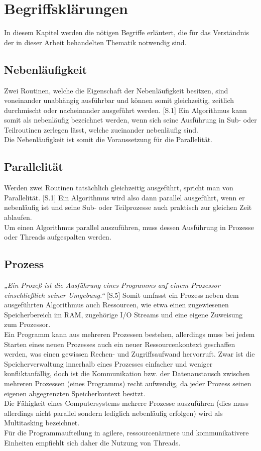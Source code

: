 \chapter{Begriffsklärungen}
In diesem Kapitel werden die nötigen Begriffe erläutert, die für das Verständnis der in dieser Arbeit behandelten Thematik notwendig sind.

\section{Nebenläufigkeit}
Zwei Routinen, welche die Eigenschaft der Nebenläufigkeit besitzen, sind voneinander unabhängig ausführbar und können somit gleichzeitig, zeitlich durchmischt oder nacheinander ausgeführt werden. \cite{Hauck_Technische_Informatik}[S.1] Ein Algorithmus kann somit als nebenläufig bezeichnet werden, wenn sich seine Ausführung in Sub- oder Teilroutinen zerlegen lässt, welche zueinander nebenläufig sind.\\
Die Nebenläufigkeit ist somit die Voraussetzung für die Parallelität.

\section{Parallelität}
Werden zwei Routinen tatsächlich gleichzeitig ausgeführt, spricht man von Parallelität. \cite{Hauck_Technische_Informatik}[S.1] Ein Algorithmus wird also dann parallel ausgeführt, wenn er nebenläufig ist und seine Sub- oder Teilprozesse auch praktisch zur gleichen Zeit ablaufen.\\
Um einen Algorithmus parallel auszuführen, muss dessen Ausführung in Prozesse oder Threads aufgespalten werden.

\section{Prozess}
\textit{„Ein Prozeß ist die Ausführung eines Programms auf einem Prozessor einschließlich seiner Umgebung.“} \cite{Strey_Konzepte_von_Betriebssystemen}[S.5] Somit umfasst ein Prozess neben dem ausgeführten Algorithmus auch Ressourcen, wie etwa einen zugewiesenen Speicherbereich im \ac{RAM}, zugehörige \ac{I/O} Streams und eine eigene Zuweisung zum Prozessor.\\
Ein Programm kann aus mehreren Prozessen bestehen, allerdings muss bei jedem Starten eines neuen Prozesses auch ein neuer Ressourcenkontext geschaffen werden, was einen gewissen Rechen- und Zugriffsaufwand hervorruft. Zwar ist die Speicherverwaltung innerhalb eines Prozesses einfacher und weniger konfliktanfällig, doch ist die Kommunikation bzw. der Datenaustausch zwischen mehreren Prozessen (eines Programms) recht aufwendig, da jeder Prozess seinen eigenen abgegrenzten Speicherkontext besitzt.\\
Die Fähigkeit eines Computersystems mehrere Prozesse auszuführen (dies muss allerdings nicht parallel sondern lediglich nebenläufig erfolgen) wird als Multitasking bezeichnet.\\
Für die Programmaufteilung in agilere, ressourcenärmere und kommunikativere Einheiten empfiehlt sich daher die Nutzung von Threads.

